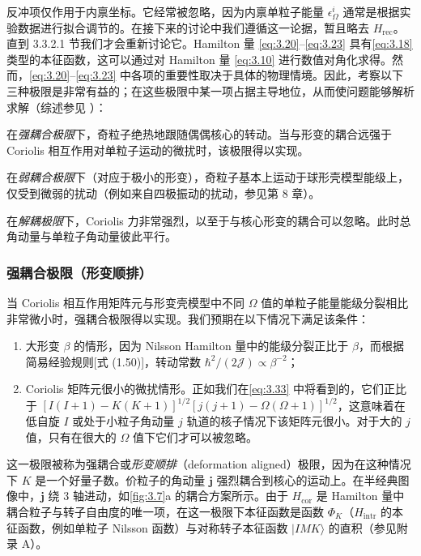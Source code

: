 反冲项仅作用于内禀坐标。它经常被忽略，因为内禀单粒子能量 $\epsilon^{i}_{\Omega}$ 通常是根据实验数据进行拟合调节的。在接下来的讨论中我们遵循这一论据，暂且略去
$H_{\text{rec}}$。直到 3.3.2.1 节我们才会重新讨论它。Hamilton 量 \ref{eq:3.20}–\ref{eq:3.23}
具有\ref{eq:3.18} 类型的本征函数，这可以通过对 Hamilton 量 \ref{eq:3.10} 进行数值对角化求得。然而，\ref{eq:3.20}–\ref{eq:3.23}
中各项的重要性取决于具体的物理情境。因此，考察以下三种极限是非常有益的；在这些极限中某一项占据主导地位，从而使问题能够解析求解（综述参见
\cite{St75a}）：

在\emph{强耦合极限}下，奇粒子绝热地跟随偶偶核心的转动。当与形变的耦合远强于 Coriolis 相互作用对单粒子运动的微扰时，该极限得以实现。

在\emph{弱耦合极限}下（对应于极小的形变），奇粒子基本上运动于球形壳模型能级上，仅受到微弱的扰动（例如来自四极振动的扰动，参见第
8 章）。

在\emph{解耦极限}下，Coriolis 力非常强烈，以至于与核心形变的耦合可以忽略。此时总角动量与单粒子角动量彼此平行。

\subsubsection{强耦合极限（形变顺排）}

当 Coriolis 相互作用矩阵元与形变壳模型中不同 $\Omega$ 值的单粒子能量能级分裂相比非常微小时，强耦合极限得以实现。我们预期在以下情况下满足该条件：
\begin{enumerate}
\item[(i)] 大形变 $\beta$ 的情形，因为 Nilsson Hamilton 量中的能级分裂正比于 $\beta$，而根据简易经验规则{[}式
(1.50){]}，转动常数 $\hbar^{2}/(2\mathcal{J})\propto\beta^{-2}$；
\item[(ii)] Coriolis 矩阵元很小的微扰情形。正如我们在\ref{eq:3.33} 中将看到的，它们正比于 $[I(I+1)-K(K+1)]^{1/2}[j(j+1)-\Omega(\Omega+1)]^{1/2}$，这意味着在低自旋
$I$ 或处于小粒子角动量 $j$ 轨道的核子情况下该矩阵元很小。对于大的 $j$ 值，只有在很大的 $\Omega$ 值下它们才可以被忽略。
\end{enumerate}
这一极限被称为强耦合或\emph{形变顺排}（deformation aligned）极限，因为在这种情况下 $K$ 是一个好量子数。价粒子的角动量
$\boldsymbol{j}$ 强烈耦合到核心的运动上。在半经典图像中，$\boldsymbol{j}$ 绕 3 轴进动，如\ref{fig:3.7}a
的耦合方案所示。由于 $H_{\text{cor}}$ 是 Hamilton 量中耦合粒子与转子自由度的唯一项，在这一极限下本征函数是函数
$\Phi_{K}$（$H_{\text{intr}}$ 的本征函数，例如单粒子 Nilsson 函数）与对称转子本征函数 $|IMK\rangle$
的直积（参见附录 A）。

